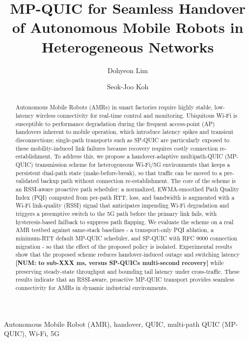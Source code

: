 \documentclass[preprint,11pt]{elsarticle}
\begin{document}
\begin{frontmatter}
\title{MP-QUIC for Seamless Handover of Autonomous Mobile Robots in Heterogeneous Networks}
\author[a]{Dohyeon Lim}
\author[b]{Seok-Joo Koh}
\begin{abstract}
Autonomous Mobile Robots (AMRs) in smart factories require highly stable, low-latency wireless connectivity for real-time control and monitoring. Ubiquitous Wi-Fi is susceptible to performance degradation during the frequent access-point (AP) handovers inherent to mobile operation, which introduce latency spikes and transient disconnections; single-path transports such as SP-QUIC are particularly exposed to these mobility-induced link failures because recovery requires costly connection re-establishment. To address this, we propose a handover-adaptive multipath-QUIC (MP-QUIC) transmission scheme for heterogeneous Wi-Fi/5G environments that keeps a persistent dual-path state (make-before-break), so that traffic can be moved to a pre-validated backup path without connection re-establishment. The core of the scheme is an RSSI-aware proactive path scheduler: a normalized, EWMA-smoothed Path Quality Index (PQI) computed from per-path RTT, loss, and bandwidth is augmented with a Wi-Fi link-quality (RSSI) signal that anticipates impending Wi-Fi degradation and triggers a preemptive switch to the 5G path before the primary link fails, with hysteresis-based failback to suppress path flapping. We evaluate the scheme on a real AMR testbed against same-stack baselines - a transport-only PQI ablation, a minimum-RTT default MP-QUIC scheduler, and SP-QUIC with RFC 9000 connection migration - so that the effect of the proposed policy is isolated. Experimental results show that the proposed scheme reduces handover-induced outage and switching latency \textbf{[NUM: to sub-XXX ms, versus SP-QUIC\textquotesingle s multi-second recovery]} while preserving steady-state throughput and bounding tail latency under cross-traffic. These results indicate that an RSSI-aware, proactive MP-QUIC transport provides seamless connectivity for AMRs in dynamic industrial environments.
\end{abstract}
\begin{keyword}
Autonomous Mobile Robot (AMR), handover, QUIC, multi-path QUIC (MP-QUIC), Wi-Fi, 5G
\end{keyword}
\end{frontmatter}
\end{document}
